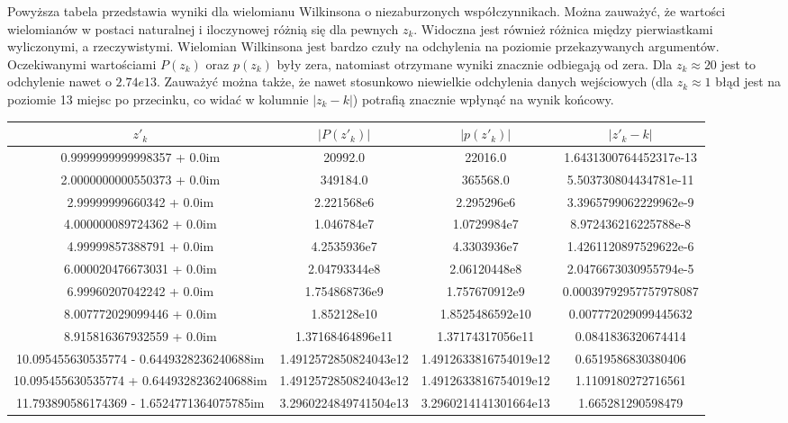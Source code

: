 \documentclass[a4paper]{article}
\begin{document}
Powyższa tabela przedstawia wyniki dla wielomianu Wilkinsona o niezaburzonych współczynnikach. Można zauważyć, że wartości wielomianów w postaci naturalnej i iloczynowej różnią się dla pewnych $z_{k}$. Widoczna jest również różnica między pierwiastkami wyliczonymi, a rzeczywistymi. Wielomian Wilkinsona jest bardzo czuły na odchylenia na poziomie przekazywanych argumentów. Oczekiwanymi wartościami $P(z_{k})$ oraz $p(z_{k})$ były zera, natomiast otrzymane wyniki znacznie odbiegają od zera. Dla $z_{k} \approx 20$ jest to odchylenie nawet o $2.74e13$. Zauważyć można także, że nawet stosunkowo niewielkie odchylenia danych wejściowych (dla $z_{k} \approx 1$ błąd jest na poziomie 13 miejsc po przecinku, co widać w kolumnie $|z_{k} - k|$) potrafią znacznie wpłynąć na wynik końcowy.

\begin{table}[ht]
\begin{adjustbox}{width=1\textwidth}
\centering
\small
 \begin{tabular}{ |c | c | c | c|  }
 \hline
 $z'_{k}$ & $|P(z'_{k})|$ & $|p(z'_{k})|$ & $|z'_{k} - k|$ \\
 \hline
 0.9999999999998357 + 0.0im & 20992.0 & 22016.0 & 1.6431300764452317e-13 \\
2.0000000000550373 + 0.0im & 349184.0 & 365568.0 & 5.503730804434781e-11 \\
2.99999999660342 + 0.0im & 2.221568e6 & 2.295296e6 & 3.3965799062229962e-9 \\
4.000000089724362 + 0.0im & 1.046784e7 & 1.0729984e7 & 8.972436216225788e-8 \\
4.99999857388791 + 0.0im & 4.2535936e7 & 4.3303936e7 & 1.4261120897529622e-6 \\
6.000020476673031 + 0.0im & 2.04793344e8 & 2.06120448e8 & 2.0476673030955794e-5 \\
6.99960207042242 + 0.0im & 1.754868736e9 & 1.757670912e9 & 0.00039792957757978087 \\
8.007772029099446 + 0.0im & 1.852128e10 & 1.8525486592e10 & 0.007772029099445632 \\
8.915816367932559 + 0.0im & 1.37168464896e11 & 1.37174317056e11 & 0.0841836320674414 \\
10.095455630535774 - 0.6449328236240688im & 1.4912572850824043e12 & 1.4912633816754019e12 & 0.6519586830380406 \\
10.095455630535774 + 0.6449328236240688im & 1.4912572850824043e12 & 1.4912633816754019e12 & 1.1109180272716561 \\
11.793890586174369 - 1.6524771364075785im & 3.2960224849741504e13 & 3.2960214141301664e13 & 1.665281290598479 \\

\end{tabular}
\end{adjustbox}
\end{table}
\end{document}
